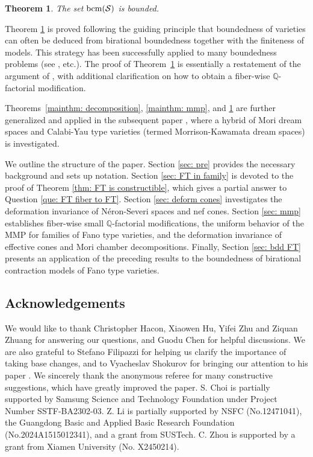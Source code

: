 \documentclass[11pt,oneside,reqno]{amsart}
\numberwithin{equation}{section}
\newtheorem{theorem}[proposition]{Theorem}
\theoremstyle{definition}
\newcommand{\bQ}{\mathbb{Q}}
\newcommand{\mS}{\mathcal{S}}
\begin{document}
\begin{theorem}\label{mainthm: bdd}
The set ${\rm bcm}(\mS)$ is bounded.
\end{theorem}

Theorem \ref{mainthm: bdd} is proved following the guiding principle that boundedness of varieties can often be deduced from birational boundedness together with the finiteness of models. This strategy has been successfully applied to many boundedness problems (see \cites{HX15, HMX18, MST20, FHS20}, etc.). The proof of Theorem~\ref{mainthm: bdd} is essentially a restatement of the argument of \cite[Theorem~1.3]{HX15}, with additional clarification on how to obtain a fiber-wise $\bQ$-factorial modification.

Theorems~\ref{mainthm: decomposition}, \ref{mainthm: mmp}, and \ref{mainthm: bdd} are further generalized and applied in the subsequent paper \cite{CLLZ25}, where a hybrid of Mori dream spaces and Calabi-Yau type varieties (termed Morrison-Kawamata dream spaces) is investigated.


We outline the structure of the paper. Section \ref{sec: pre} provides the necessary background and sets up notation. Section \ref{sec: FT in family} is devoted to the proof of Theorem \ref{thm: FT is constructible}, which gives a partial answer to Question \ref{que: FT fiber to FT}. Section \ref{sec: deform cones} investigates the deformation invariance of N\'eron-Severi spaces and nef cones. Section \ref{sec: mmp} establishes fiber-wise small $\mathbb{Q}$-factorial modifications, the uniform behavior of the MMP for families of Fano type varieties, and the deformation invariance of effective cones and Mori chamber decompositions. Finally, Section \ref{sec: bdd FT} presents an application of the preceding results to the boundedness of birational contraction models of Fano type varieties. 

\subsection*{Acknowledgements}  
We would like to thank Christopher Hacon, Xiaowen Hu, Yifei Zhu and Ziquan Zhuang for answering our questions, and Guodu Chen for helpful discussions. We are also grateful to Stefano Filipazzi for helping us clarify the importance of taking base changes, and to Vyacheslav Shokurov for bringing our attention to his paper \cite{Sho20}. We sincerely thank the anonymous referee for many constructive suggestions, which have greatly improved the paper. S. Choi is partially supported by Samsung Science and Technology Foundation under Project Number SSTF-BA2302-03. Z. Li is partially supported by NSFC (No.12471041), the Guangdong Basic and Applied Basic Research Foundation (No.2024A1515012341), and a grant from SUSTech. C. Zhou is supported by a grant from Xiamen University (No. X2450214).
\end{document}
